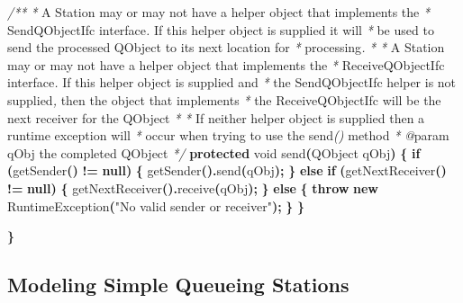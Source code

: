\documentclass[
]{book}
\newenvironment{Shaded}{\begin{snugshade}}{\end{snugshade}}
\newcommand{\BuiltInTok}[1]{#1}
\newcommand{\CommentTok}[1]{\textcolor[rgb]{0.56,0.35,0.01}{\textit{#1}}}
\newcommand{\ControlFlowTok}[1]{\textcolor[rgb]{0.13,0.29,0.53}{\textbf{#1}}}
\newcommand{\DataTypeTok}[1]{\textcolor[rgb]{0.13,0.29,0.53}{#1}}
\newcommand{\FunctionTok}[1]{\textcolor[rgb]{0.00,0.00,0.00}{#1}}
\newcommand{\KeywordTok}[1]{\textcolor[rgb]{0.13,0.29,0.53}{\textbf{#1}}}
\newcommand{\NormalTok}[1]{#1}
\newcommand{\OperatorTok}[1]{\textcolor[rgb]{0.81,0.36,0.00}{\textbf{#1}}}
\newcommand{\StringTok}[1]{\textcolor[rgb]{0.31,0.60,0.02}{#1}}
\theoremstyle{definition}
\theoremstyle{definition}
\theoremstyle{definition}
\theoremstyle{definition}
\theoremstyle{remark}
\begin{document}
\begin{Shaded}
\begin{Highlighting}[]
    \CommentTok{/**}
     \CommentTok{*}\NormalTok{  A Station may or may not have a helper object that implements the }
     \CommentTok{*}\NormalTok{  SendQObjectIfc interface}\CommentTok{. }\NormalTok{ If this helper object is supplied it will}
     \CommentTok{*}\NormalTok{  be used to send the processed QObject to its next location for}
     \CommentTok{*}\NormalTok{  processing}\CommentTok{.}
     \CommentTok{*} 
     \CommentTok{*}\NormalTok{  A Station may or may not have a helper object that implements the }
     \CommentTok{*}\NormalTok{  ReceiveQObjectIfc interface}\CommentTok{.}\NormalTok{  If this helper object is supplied and}
     \CommentTok{*}\NormalTok{  the SendQObjectIfc helper is not supplied}\CommentTok{,}\NormalTok{ then the object that implements}
     \CommentTok{*}\NormalTok{  the ReceiveQObjectIfc will be the next receiver for the QObject}
     \CommentTok{*} 
     \CommentTok{*}\NormalTok{  If neither helper object is supplied then a runtime exception will}
     \CommentTok{*}\NormalTok{  occur when trying to use the send}\CommentTok{()}\NormalTok{ method     }
     \CommentTok{*} \CommentTok{@}\NormalTok{param qObj the completed QObject}
     \CommentTok{*/}
    \KeywordTok{protected} \DataTypeTok{void} \FunctionTok{send}\OperatorTok{(}\NormalTok{QObject qObj}\OperatorTok{)} \OperatorTok{\{}
        \ControlFlowTok{if} \OperatorTok{(}\FunctionTok{getSender}\OperatorTok{()} \OperatorTok{!=} \KeywordTok{null}\OperatorTok{)} \OperatorTok{\{}
            \FunctionTok{getSender}\OperatorTok{().}\FunctionTok{send}\OperatorTok{(}\NormalTok{qObj}\OperatorTok{);}
        \OperatorTok{\}} \ControlFlowTok{else} \ControlFlowTok{if} \OperatorTok{(}\FunctionTok{getNextReceiver}\OperatorTok{()} \OperatorTok{!=} \KeywordTok{null}\OperatorTok{)} \OperatorTok{\{}
            \FunctionTok{getNextReceiver}\OperatorTok{().}\FunctionTok{receive}\OperatorTok{(}\NormalTok{qObj}\OperatorTok{);}
        \OperatorTok{\}} \ControlFlowTok{else} \OperatorTok{\{}
            \ControlFlowTok{throw} \KeywordTok{new} \BuiltInTok{RuntimeException}\OperatorTok{(}\StringTok{"No valid sender or receiver"}\OperatorTok{);}
        \OperatorTok{\}}
    \OperatorTok{\}}

\OperatorTok{\}}
\end{Highlighting}
\end{Shaded}

\hypertarget{modeling-simple-queueing-stations}{%
\subsection{Modeling Simple Queueing Stations}\label{modeling-simple-queueing-stations}}
\end{document}
